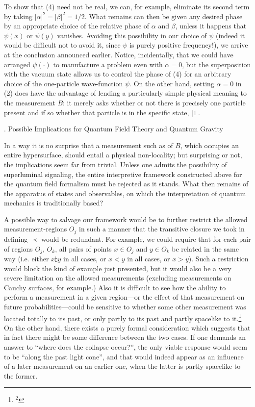 \tx
To show that (4) need not be real, we can, for example, eliminate its
second term by taking $|\alpha|^2=|\beta|^2=1/2$.  What remains can
then be given any desired phase by an appropriate choice of the
relative phase of $\alpha$ and $\beta$, unless it happens that
$\psi(x)$ or $\psi(y)$ vanishes.  Avoiding this possibility in our
choice of $\psi$ (indeed it would be difficult not to avoid it, since
$\psi$ is purely positive frequency!), we arrive at the conclusion
announced earlier.  Notice, incidentally, that we could have arranged
$\psi(\cdot)$ to manufacture a problem even with $\alpha=0$, but the
superposition with the vacuum state allows us to control the phase of
(4) for an arbitrary choice of the one-particle wave-function $\psi$.
On the other hand, setting $\alpha=0$ in (2) does have the advantage
of lending a particularly simple physical meaning to the measurement
$B$: it merely asks whether or not there is precisely one particle
present and if so whether that particle is in the specific state,
$|1\>$.
\vfill\break

. Possible Implications for Quantum Field Theory and Quantum
       Gravity\par

\tx
In a way it is no surprise that a measurement such as of $B$, which
occupies an entire hypersurface, should entail a physical
non-locality; but surprising or not, the implications seem far from
trivial.  Unless one admits the possibility of superluminal signaling,
the entire interpretive framework constructed above for the quantum
field formalism must be rejected as it stands.  What then remains of
the apparatus of states and observables, on which the interpretation
of quantum mechanics is traditionally based?

\tx
A possible way to salvage our framework would be to further restrict
the allowed measurement-regions $O_j$  in such a manner that the
transitive closure we took in defining $\prec$ would be redundant.
For example, we could require that for each pair of regions $O_j$,
$O_k$, all pairs of points $x\in O_j$ and $y\in O_k$ be related in the
same way (i.e. either $x\natural y$ in all cases, or $x<y$ in all
cases, or $x>y$).  Such a restriction would block the kind of example
just presented, but it would also be a very severe limitation on
the allowed measurements (excluding measurements on Cauchy surfaces,
for example.)  Also it is difficult to see how the ability to perform
a measurement in a given region---or the effect of that measurement on
future probabilities---could be sensitive to whether some other
measurement was located totally to its past, or only partly to its
past and partly spacelike to it.\footnote{$^2$}
%
{On the other hand, there exists a purely formal consideration which
suggests that in fact there might be some difference between the two
cases.  If one demands an answer to ``where does the collapse
occur?'', the only viable response would seem to be ``along the past
light cone'', and that would indeed appear as an influence of a later
measurement on an earlier one, when the latter is partly spacelike to
the former.\smallskip }

